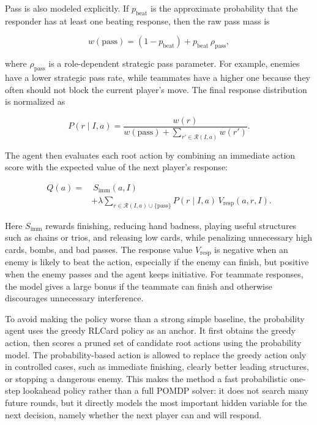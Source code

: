 Pass is also modeled explicitly. If \(p_{\mathrm{beat}}\) is the approximate
probability that the responder has at least one beating response, then the raw
pass mass is

\[
    w(\mathrm{pass})
    =
    (1-p_{\mathrm{beat}})
    +
    p_{\mathrm{beat}}\,\rho_{\mathrm{pass}},
\]

where \(\rho_{\mathrm{pass}}\) is a role-dependent strategic pass parameter.
For example, enemies have a lower strategic pass rate, while teammates have a
higher one because they often should not block the current player's move. The
final response distribution is normalized as

\[
    P(r\mid I,a)
    =
    \frac{w(r)}
    {w(\mathrm{pass})+\sum_{r'\in\mathcal{R}(I,a)}w(r')}.
\]

The agent then evaluates each root action by combining an immediate action score
with the expected value of the next player's response:

\begin{align*}
    Q(a)
    = & \ S_{\mathrm{imm}}(a,I) \\
      & +
    \lambda
    \sum_{r\in\mathcal{R}(I,a)\cup\{\mathrm{pass}\}}
    P(r\mid I,a)\,V_{\mathrm{resp}}(a,r,I).
\end{align*}

Here \(S_{\mathrm{imm}}\) rewards finishing, reducing hand badness, playing
useful structures such as chains or trios, and releasing low cards, while
penalizing unnecessary high cards, bombs, and bad passes. The response value
\(V_{\mathrm{resp}}\) is negative when an enemy is likely to beat the action,
especially if the enemy can finish, but positive when the enemy passes and the
agent keeps initiative. For teammate responses, the model gives a large bonus if
the teammate can finish and otherwise discourages unnecessary interference.

To avoid making the policy worse than a strong simple baseline, the probability
agent uses the greedy RLCard policy as an anchor. It first obtains the greedy
action, then scores a pruned set of candidate root actions using the probability
model. The probability-based action is allowed to replace the greedy action only
in controlled cases, such as immediate finishing, clearly better leading
structures, or stopping a dangerous enemy. This makes the method a fast
probabilistic one-step lookahead policy rather than a full POMDP solver: it does
not search many future rounds, but it directly models the most important hidden
variable for the next decision, namely whether the next player can and will
respond.
